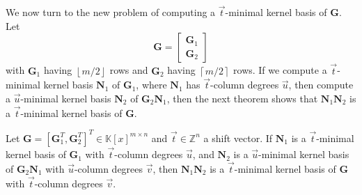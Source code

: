 We now turn to the new problem of computing a $\vec{t}$-minimal kernel
basis of $\mathbf{G}$. Let 
\[
\mathbf{G}=\left[\begin{array}{c}
\mathbf{G}_{1}\\
\mathbf{G}_{2}
\end{array}\right]
\]
 with $\mathbf{G}_{1}$ having $\left\lfloor m/2\right\rfloor $ rows
and $\mathbf{G}_{2}$ having $\left\lceil m/2\right\rceil $ rows.
If we compute a $\vec{t}$-minimal kernel basis $\mathbf{N}_{1}$
of $\mathbf{G}_{1}$, where $\mathbf{N}_{1}$ has $\vec{t}$-column
degrees $\vec{u}$, then compute a $\vec{u}$-minimal kernel basis
$\mathbf{N}_{2}$ of $\mathbf{G}_{2}\mathbf{N}_{1}$, then the next
theorem %
shows that $\mathbf{N}_{1}\mathbf{N}_{2}$ is a $\vec{t}$-minimal
kernel basis of $\mathbf{G}$. 
\begin{thm}
\label{thm:continueComputingNullspaceBasisByRows}Let %
$\mathbf{G}=\left[\mathbf{G}_{1}^{T},\mathbf{G}_{2}^{T}\right]^{T}\in\mathbb{K}\left[x\right]^{m\times n}$
and $\vec{t}\in\mathbb{Z}^{n}$ a shift vector. If $\mathbf{N}_{1}$
is a $\vec{t}$-minimal kernel basis of $\mathbf{G}_{1}$ with $\vec{t}$-column
degrees $\vec{u}$, and $\mathbf{N}_{2}$ is a $\vec{u}$-minimal
kernel basis of $\mathbf{G}_{2}\mathbf{N}_{1}$ with $\vec{u}$-column
degrees $\vec{v}$, then $\mathbf{N}_{1}\mathbf{N}_{2}$ is a $\vec{t}$-minimal
kernel basis of $\mathbf{G}$ with $\vec{t}$-column degrees $\vec{v}$.\end{thm}
